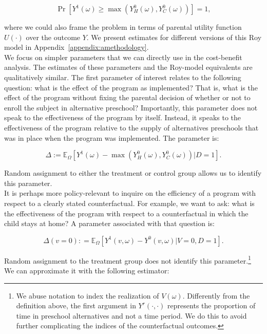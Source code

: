 \begin{equation}
\Pr \left[ Y^1 \left( \omega \right) \geq \max \left(  Y_{H}^0 \left( \omega \right) ,  Y_{C}^0 \left( \omega \right)   \right) \right] = 1, \label{eq:noutility}
\end{equation}

\noindent where we could also frame the problem in terms of parental utility function $U \left( \cdot \right) $ over the outcome $Y$. We present estimates for different versions of this Roy model in Appendix~\ref{appendix:amethodology}.\\ 

\noindent We focus on simpler parameters that we can directly use in the cost-benefit analysis. The estimates of these parameters and the Roy-model equivalents are qualitatively similar. The first parameter of interest relates to the following question: what is the effect of the program as implemented? That is, what is the effect of the program without fixing the parental decision of whether or not to enroll the subject in alternative preschool? Importantly, this parameter does not speak to the effectiveness of the program by itself. Instead, it speaks to the effectiveness of the program relative to the supply of alternatives preschools that was in place when the program was implemented. The parameter is: 

\begin{equation}
\Delta := \mathbb{E}_{\Omega} \left[ Y^1 \left( \omega \right) -  \max \left(  Y_{H}^0 \left( \omega \right) ,  Y_{C}^0 \left( \omega \right)  \right) | D =1 \right]. \label{eq:mainest}
\end{equation}

\noindent Random assignment to either the treatment or control group allows us to identify this parameter.\\ 

\noindent It is perhaps more policy-relevant to inquire on the efficiency of a program with respect to a clearly stated counterfactual. For example, we want to ask: what is the effectiveness of the program with respect to a counterfactual in which the child stays at home? A parameter associated with that question is: 

\begin{equation}
\Delta \left( v = 0 \right) : =   \mathbb{E}_{\Omega} \left[ Y^1 \left( v, \omega \right) - Y^0 \left( v, \omega \right) | V = 0, D = 1 \right]. \label{eq:par0}
\end{equation}

\noindent Random assignment to the treatment group does not identify this parameter.\footnote{We abuse notation to index the realization of $V \left( \omega \right)$. Differently from the definition above, the first argument in $Y^r \left( \cdot, \cdot \right)$ represents the proportion of time in preschool alternatives and not a time period. We do this to avoid further complicating the indices of the counterfactual outcomes.} We can approximate it with the following estimator: 

